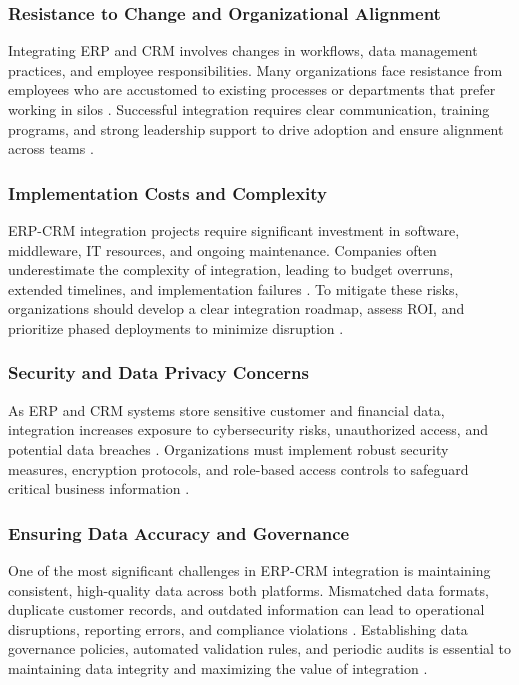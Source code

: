 \subsubsection{Resistance to Change and Organizational Alignment}
Integrating ERP and CRM involves changes in workflows, data management practices, and employee responsibilities. Many organizations face resistance from employees who are accustomed to existing processes or departments that prefer working in silos \cite{gebreyes2018}. Successful integration requires clear communication, training programs, and strong leadership support to drive adoption and ensure alignment across teams \cite{ruivo2014}.

\subsubsection{Implementation Costs and Complexity}
ERP-CRM integration projects require significant investment in software, middleware, IT resources, and ongoing maintenance. Companies often underestimate the complexity of integration, leading to budget overruns, extended timelines, and implementation failures \cite{mestre2015}. To mitigate these risks, organizations should develop a clear integration roadmap, assess ROI, and prioritize phased deployments to minimize disruption \cite{hendricks2007}.

\subsubsection{Security and Data Privacy Concerns}
As ERP and CRM systems store sensitive customer and financial data, integration increases exposure to cybersecurity risks, unauthorized access, and potential data breaches \cite{devarashetty2023}. Organizations must implement robust security measures, encryption protocols, and role-based access controls to safeguard critical business information \cite{ruivo2014}.

\subsubsection{Ensuring Data Accuracy and Governance}
One of the most significant challenges in ERP-CRM integration is maintaining consistent, high-quality data across both platforms. Mismatched data formats, duplicate customer records, and outdated information can lead to operational disruptions, reporting errors, and compliance violations \cite{gebreyes2018}. Establishing data governance policies, automated validation rules, and periodic audits is essential to maintaining data integrity and maximizing the value of integration \cite{shaul2013}.

